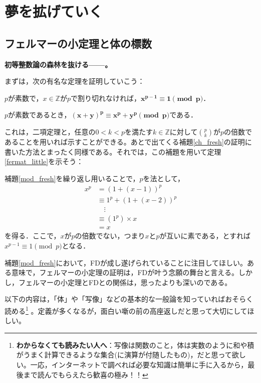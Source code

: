 \section{夢を拡げていく}\label{dreaming}
\subsection{フェルマーの小定理と体の標数}
\textbf{初等整数論の森林を抜ける------。}

\vspace{10pt}

まずは，次の有名な定理を証明していこう：

\begin{thm}[フェルマーの小定理]\label{fermat_little}
    $p$が素数で，$x \in \mathds{Z}$が$p$で割り切れなければ，$\boldsymbol{x^{p-1} \equiv 1 \pmod{p}}$．
\end{thm}

\begin{lemma}[\textsf{FD}]\label{mod_fresh}
    $p$が素数であるとき，$\boldsymbol{(x + y)^p \equiv x^p + y^p \pmod{p}}$である．
\end{lemma}
これは，二項定理と，任意の$0 < k < pを満たすk \in \mathds{Z}$に対して$\binom{p}{k}$が$p$の倍数であることを用いれば示すことができる。あとで出てくる補題\ref{ch_fresh}の証明に書いた方法とまったく同様である。それでは，この補題を用いて定理\ref{fermat_little}を示そう：
\begin{prf}
    補題\ref{mod_fresh}を繰り返し用いることで，$p$を法として，
    \begin{align*}
    x^{p} & = (1 + (x - 1))^p  \\
    & \equiv 1^p + (1 + (x - 2))^p \\
    & \quad \vdots \\
    & \equiv (1^p) \times x \\
    & = x
\end{align*}
を得る．ここで，$x$が$p$の倍数でない，つまり$x$と$p$が互いに素である，とすれば$x^{p-1} \equiv 1 \pmod{p}$となる．
\end{prf}

補題\ref{mod_fresh}において，\textsf{FD}が成し遂げられていることに注目してほしい。ある意味で，フェルマーの小定理の証明は，\textsf{FD}が叶う念願の舞台と言える。しかし，フェルマーの小定理と\textsf{FD}との関係は，思ったよりも深いのである。

以下の内容は，「体」や「写像」などの基本的な一般論を知っていればおそらく読める\footnote{
\textbf{わからなくても読みたい人へ}：写像は関数のこと，体は実数のように和や積がうまく計算できるような集合(に演算が付随したもの)，だと思って欲しい。一応，インターネットで調べれば必要な知識は簡単に手に入るから，最後まで読んでもらえたら歓喜の極み！！
} 。定義が多くなるが，面白い噺の前の高座返しだと思って大切にしてほしい。

